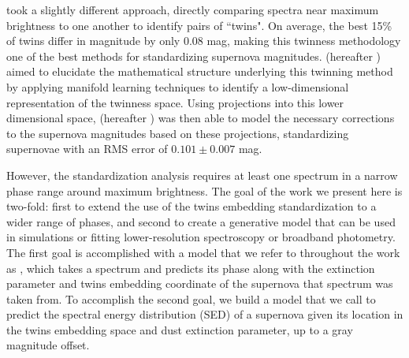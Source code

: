 \citet{fakhouri_improving_2015} took a slightly different approach, directly comparing spectra near maximum brightness to one another to identify pairs of ``twins". On average, the best 15\% of twins differ in magnitude by only 0.08 mag, making this twinness methodology one of the best methods for standardizing supernova magnitudes. \citet{boone_twins_2020a} (hereafter ) aimed to elucidate the mathematical structure underlying this twinning method by applying manifold learning techniques to identify a low-dimensional representation of the twinness space. Using projections into this lower dimensional space, \citet{boone_twins_2020b} (hereafter ) was then able to model the necessary corrections to the supernova magnitudes based on these projections, standardizing supernovae with an RMS error of $0.101 \pm 0.007$ mag.

However, the  standardization analysis requires at least one spectrum in a narrow phase range around maximum brightness. The goal of the work we present here is two-fold: first to extend the use of the twins embedding standardization to a wider range of phases, and second to create a generative model that can be used in simulations or fitting lower-resolution spectroscopy or broadband photometry. The first goal is accomplished with a model that we refer to throughout the work as \stoe, which takes a spectrum and predicts its phase along with the extinction parameter and twins embedding coordinate of the supernova that spectrum was taken from. To accomplish the second goal, we build a model that we call \etos{} to predict the spectral energy distribution (SED) of a supernova given its location in the twins embedding space and dust extinction parameter, up to a gray magnitude offset.

